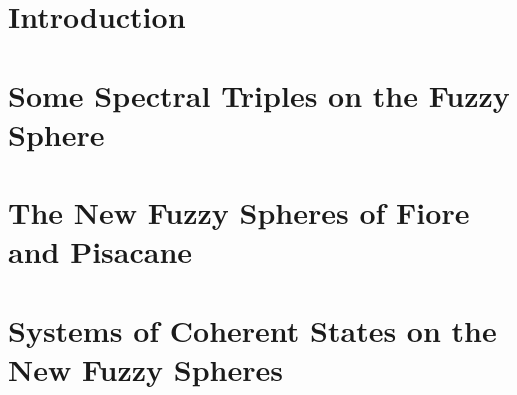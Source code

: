 \documentclass[12pt]{report}
\theoremstyle{definition}
\begin{document}
\setcounter{chapter}{0}
\chapter{Introduction}\label{chp:intro}


\chapter{Some Spectral Triples on the Fuzzy Sphere}\label{chp:fuzzysphere}


\chapter{The New Fuzzy Spheres of Fiore and Pisacane}\label{chp:NewFuzzy}


\chapter{Systems of Coherent States on the New Fuzzy Spheres}\label{chp:CHNew}


% 
\end{document}
